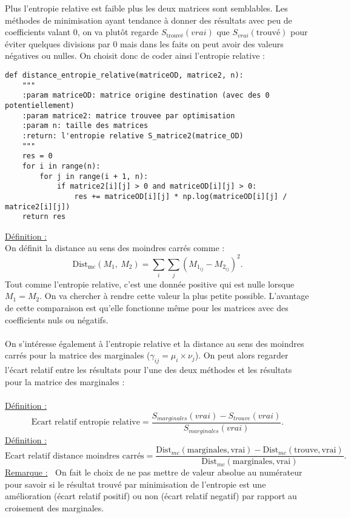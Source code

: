 \documentclass[12pt]{article}
\newcommand{\defin}{\underline{Définition :} }
\newcommand{\rmq}{\underline{Remarque :} }
\begin{document}
 Plus l'entropie relative est faible plus les deux matrices sont semblables. Les méthodes de minimisation ayant tendance à donner des résultats avec peu de coefficients valant 0, on va plutôt regarde $S_{\text{trouvé}}(vrai)$ que $S_{vrai}(\text{trouvé})$ pour éviter quelques divisions par 0 mais dans les faits on peut avoir des valeurs négatives ou nulles. On choisit donc de coder ainsi l'entropie relative :\\
\begin{lstlisting}
def distance_entropie_relative(matriceOD, matrice2, n):
    """
    :param matriceOD: matrice origine destination (avec des 0 potentiellement)
    :param matrice2: matrice trouvee par optimisation
    :param n: taille des matrices
    :return: l'entropie relative S_matrice2(matrice_OD)
    """
    res = 0
    for i in range(n):
        for j in range(i + 1, n):
            if matrice2[i][j] > 0 and matriceOD[i][j] > 0:
                res += matriceOD[i][j] * np.log(matriceOD[i][j] / matrice2[i][j])
    return res
\end{lstlisting}
\defin\\
On définit la distance au sens des moindres carrés comme :
\[\text{Dist}_{\text{mc}}(M_1,\:M_2) = \sum_i\sum_j (M_{1_{ij}}-M_{2_{ij}})^2.\]
Tout comme l'entropie relative, c'est une donnée positive qui est nulle lorsque $M_1 = M_2$. On va chercher à rendre cette valeur la plus petite possible. L'avantage de cette comparaison est qu'elle fonctionne même pour les matrices avec des coefficients nuls ou négatifs.\\
\\
On s'intéresse également à l'entropie relative et la distance au sens des moindres carrés pour la matrice des marginales ($\gamma_{ij} = \mu_i \times \nu_j$). On peut alors regarder l'écart relatif entre les résultats pour l'une des deux méthodes et les résultats pour la matrice des marginales :\\
\\
\defin
\[
\text{Ecart relatif entropie relative} = \frac{S_{marginales}(vrai) -S_{trouve}(vrai)}{S_{marginales}(vrai)}.
\]
\defin
\[
\text{Ecart relatif distance moindres carrés}= \frac{\text{Dist}_{mc}(\text{marginales},\text{vrai}) - \text{Dist}_{mc}(\text{trouve},\text{vrai}) }{ \text{Dist}_{mc}(\text{marginales},\text{vrai})}.
\]
\rmq $\:$ On fait le choix de ne pas mettre de valeur absolue au numérateur pour savoir si le résultat trouvé par minimisation de l'entropie est une amélioration (écart relatif positif) ou non (écart relatif negatif) par rapport au croisement des marginales.\\
\end{document}
